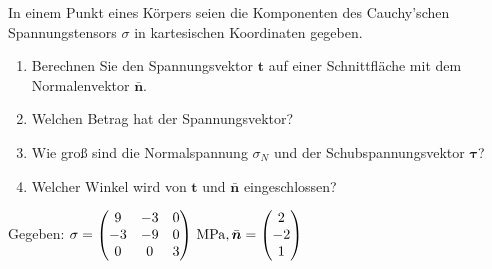 \documentclass{exercise}
\begin{document}
    \begin{problem}
        In einem Punkt eines Körpers seien die Komponenten des Cauchy'schen Spannungstensors \(\sigma\) in kartesischen Koordinaten gegeben.
        \begin{enumerate}
            \item Berechnen Sie den Spannungsvektor \(\bm{t}\) auf einer Schnittfläche mit dem Normalenvektor \(\bar{\bm{n}}\).
            \item Welchen Betrag hat der Spannungsvektor?
            \item Wie groß sind die Normalspannung \(\sigma_N\) und der Schubspannungsvektor \(\bm{\tau}\)?
            \item Welcher Winkel wird von \(\bm{t}\) und \(\bar{\bm{n}}\) eingeschlossen?
        \end{enumerate}
        Gegeben: \(\sigma = \begin{pmatrix}
            9 & -3 & 0\\
            -3 & -9 & 0\\
            0 & 0 & 3
        \end{pmatrix}\,\si{\mega\pascal}, \bar{\bm{n}} = \begin{pmatrix}
            2\\
            -2\\
            1
        \end{pmatrix}\)
    \end{problem}
\end{document}
